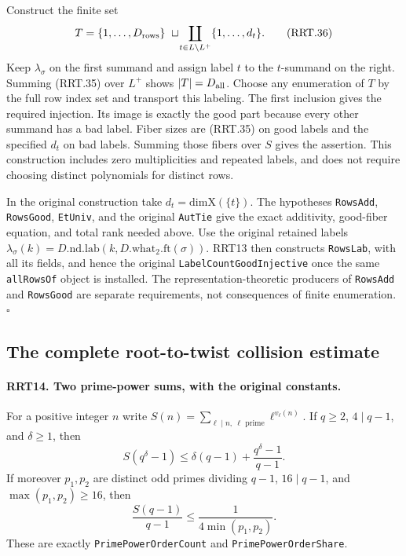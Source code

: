 Construct the finite set
\[
 T=\{1,\ldots,D_{\rm rows}\}\ \sqcup\!
            \coprod_{t\in L\setminus L^+}\{1,\ldots,d_t\}.
 \tag{RRT.36}
\]
Keep $\lambda_\sigma$ on the first summand and assign label
$t$ to the $t$-summand on the right.  Summing (RRT.35) over
$L^+$ shows $|T|=D_{\rm all}$.  Choose any enumeration of
$T$ by the full row index set and transport this labeling.
The first inclusion gives the required injection.  Its image
is exactly the good part because every other summand has a
bad label.  Fiber sizes are (RRT.35) on good labels and the
specified $d_t$ on bad labels.  Summing those fibers over $S$
gives the assertion.  This construction includes zero
multiplicities and repeated labels, and does not require
choosing distinct polynomials for distinct rows.

In the original construction take
$d_t=\mathrm{dimX}(\{t\})$.  The hypotheses
\texttt{RowsAdd}, \texttt{RowsGood}, \texttt{EtUniv}, and
the original \texttt{AutTie} give the exact additivity,
good-fiber equation, and total rank needed above.  Use the
original retained labels
$\lambda_\sigma(k)=D.\mathrm{nd}.\mathrm{lab}(k,
D.\mathrm{what}_2.\mathrm{ft}(\sigma))$.
RRT13 then constructs \texttt{RowsLab}, with all its fields,
and hence the original \texttt{LabelCountGoodInjective} once
the same \texttt{allRowsOf} object is installed.  The
representation-theoretic producers of \texttt{RowsAdd} and
\texttt{RowsGood} are separate requirements, not consequences
of finite enumeration.
\hfill$\square$

\subsection{The complete root-to-twist collision estimate}

\paragraph{RRT14. Two prime-power sums, with the original constants.}
\label{claim:RRT14}
For a positive integer $n$ write
$S(n)=\sum_{\ell\mid n,\ \ell\text{ prime}}\ell^{v_\ell(n)}$.
If $q\ge2$, $4\mid q-1$, and $\delta\ge1$, then
\[
 S(q^\delta-1)\le\delta(q-1)+\frac{q^\delta-1}{q-1}.
 \tag{RRT.37}
\]
If moreover $p_1,p_2$ are distinct odd primes dividing $q-1$,
$16\mid q-1$, and $\max(p_1,p_2)\ge16$, then
\[
               \frac{S(q-1)}{q-1}
                         \le\frac1{4\min(p_1,p_2)}.
 \tag{RRT.38}
\]
These are exactly \texttt{PrimePowerOrderCount} and
\texttt{PrimePowerOrderShare}.

